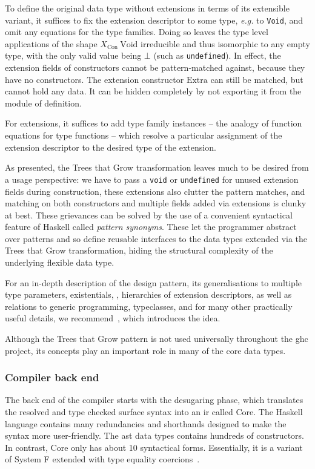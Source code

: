 \documentclass[thesis=B,english]{FITthesis}[2019/12/23]
\newcommand{\eg}{\emph{e.g.}\xspace}
\newcommand{\hsType}[1]{\texttt{#1}}
\newcommand{\hsIdent}[1]{\texttt{#1}}
\begin{document}
\begin{tcolorbox}[parbox=false, breakable, title=Trees that Grow]
To define the original data type without extensions in terms of its extensible
variant, it suffices to fix the extension descriptor to some type, \eg to
\hsType{Void}, and omit any equations for the type families. Doing so leaves
the type level applications of the shape $X_{\mathrm{Con}}~\mathrm{Void}$
irreducible and thus isomorphic to any empty type, with the only valid value
being $\bot$ (such as \hsIdent{undefined}). In effect, the extension fields of
constructors cannot be pattern-matched against, because they have no
constructors. The extension constructor $\mathrm{Extra}$ can still be matched,
but cannot hold any data. It can be hidden completely by not exporting it from
the module of definition.

For extensions, it suffices to add type family instances -- the analogy of
function equations for type functions -- which resolve a particular assignment
of the extension descriptor to the desired type of the extension.

As presented, the Trees that Grow transformation leaves much to be desired from
a usage perspective: we have to pass a \hsIdent{void} or \hsIdent{undefined}
for unused extension fields during construction, these extensions also clutter
the pattern matches, and matching on both constructors and multiple fields
added via extensions is clunky at best. These grievances can be solved by the
use of a convenient syntactical feature of Haskell called \textit{pattern
synonyms}\cite{pattern-synonyms}. These let the programmer abstract over
patterns and so define reusable interfaces to the data types extended via the
Trees that Grow transformation, hiding the structural complexity of the
underlying flexible data type.

For an in-depth description of the design pattern, its generalisations to
multiple type parameters, existentials, , hierarchies of
extension descriptors, as well as relations to generic programming,
typeclasses, and for many other practically useful details, we
recommend~\cite{trees-that-grow}, which introduces the idea.

Although the Trees that Grow pattern is not used universally throughout the
\acrshort{ghc} project, its concepts play an important role in many of the core
data types.
\end{tcolorbox}

\subsubsection*{Compiler back end}
The back end of the compiler starts with the desugaring phase, which translates
the resolved and type checked surface syntax into an \acrfull{ir} called Core.
The Haskell language contains many redundancies and shorthands designed to make
the syntax more user-friendly. The \acrshort{ast} data types contains hundreds
of constructors. In contrast, Core only has about 10 syntactical forms.
Essentially, it is a variant of System F extended with type equality
coercions~\cite{system-fc}.
\end{document}

